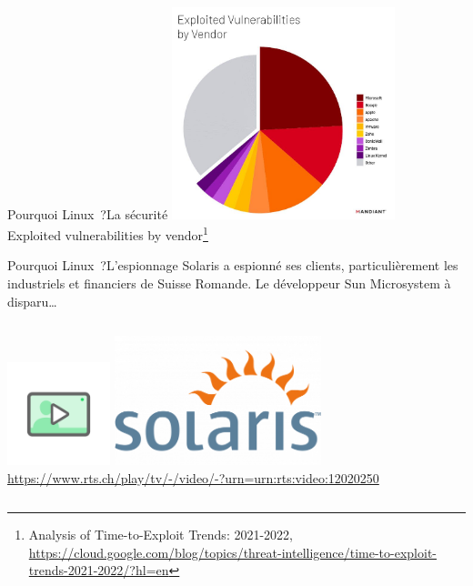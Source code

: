 \documentclass{beamer}
\begin{document}
    \begin{frame}{Pourquoi Linux~?}{La sécurité}
        \centering
        \includegraphics[width=6.5cm]{image/vendors-vuln} \\ Exploited vulnerabilities by vendor\footnote{Analysis of Time-to-Exploit Trends: 2021-2022, \url{https://cloud.google.com/blog/topics/threat-intelligence/time-to-exploit-trends-2021-2022/?hl=en}} \\
    \end{frame}

    \begin{frame}{Pourquoi Linux~?}{L'espionnage}
        Solaris a espionné ses clients, particulièrement les industriels et financiers de Suisse Romande.
        Le développeur Sun Microsystem à disparu\ldots
        \bigbreak
        \begin{columns}
            \centering
            \includegraphics[width=3cm]{image/digicomp-video}
            \includegraphics[width=6cm]{image/Solaris-Logo-2005-500x313} \\ \url{https://www.rts.ch/play/tv/-/video/-?urn=urn:rts:video:12020250} \\
        \end{columns}
    \end{frame}
\end{document}
